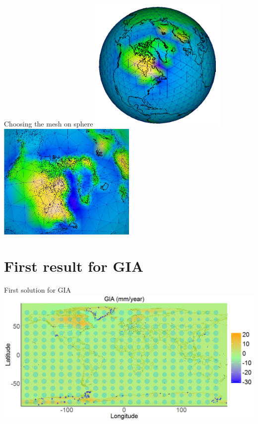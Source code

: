 \documentclass{beamer}
\begin{document}
\begin{frame}{Choosing the mesh on sphere}
\includegraphics[width=0.5\textwidth]{images/GIA_mesh1}
\includegraphics[width=0.5\textwidth]{images/GIA_mesh2}

\end{frame}

\section{First result for GIA}
\begin{frame}{First solution for GIA}
\centering
\includegraphics[width = \textwidth]{images/GIA_map}
\end{frame}
\end{document}
